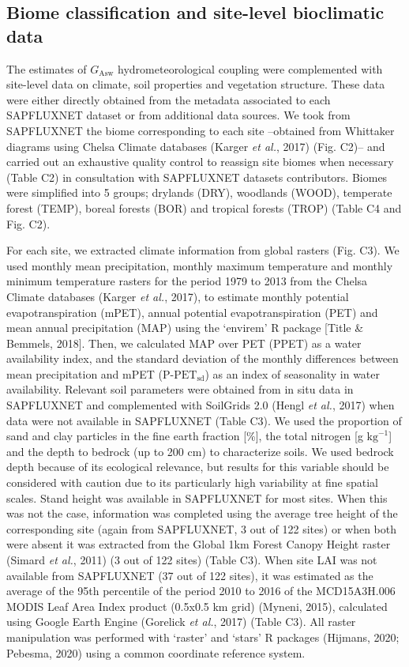 \documentclass[11pt,twoside]{reedthesis}
\begin{document}
\subsection{Biome classification and site-level bioclimatic
data}\label{biome-classification-and-site-level-bioclimatic-data}

The estimates of \(G_{\text{Asw}}\) hydrometeorological coupling were
complemented with site-level data on climate, soil properties and
vegetation structure. These data were either directly obtained from the
metadata associated to each SAPFLUXNET dataset or from additional data
sources. We took from SAPFLUXNET the biome corresponding to each site
--obtained from Whittaker diagrams using Chelsa Climate databases
(Karger \emph{et al.}, 2017) (Fig. C2)-- and carried out an exhaustive
quality control to reassign site biomes when necessary (Table C2) in
consultation with SAPFLUXNET datasets contributors. Biomes were
simplified into 5 groups; drylands (DRY), woodlands (WOOD), temperate
forest (TEMP), boreal forests (BOR) and tropical forests (TROP) (Table
C4 and Fig. C2).\par

For each site, we extracted climate information from global rasters
(Fig. C3). We used monthly mean precipitation, monthly maximum
temperature and monthly minimum temperature rasters for the period 1979
to 2013 from the Chelsa Climate databases (Karger \emph{et al.}, 2017),
to estimate monthly potential evapotranspiration (mPET), annual
potential evapotranspiration (PET) and mean annual precipitation (MAP)
using the `envirem' R package {[}Title \& Bemmels, 2018{]}. Then, we
calculated MAP over PET (PPET) as a water availability index, and the
standard deviation of the monthly differences between mean precipitation
and mPET (\(\text{P-PET}_{\text{sd}}\)) as an index of seasonality in
water availability. Relevant soil parameters were obtained from in situ
data in SAPFLUXNET and complemented with SoilGrids 2.0 (Hengl \emph{et
al.}, 2017) when data were not available in SAPFLUXNET (Table C3). We
used the proportion of sand and clay particles in the fine earth
fraction {[}\%{]}, the total nitrogen {[}g \(\text{kg}^{-1}\){]} and the
depth to bedrock (up to 200 cm) to characterize soils. We used bedrock
depth because of its ecological relevance, but results for this variable
should be considered with caution due to its particularly high
variability at fine spatial scales. Stand height was available in
SAPFLUXNET for most sites. When this was not the case, information was
completed using the average tree height of the corresponding site (again
from SAPFLUXNET, 3 out of 122 sites) or when both were absent it was
extracted from the Global 1km Forest Canopy Height raster (Simard
\emph{et al.}, 2011) (3 out of 122 sites) (Table C3). When site LAI was
not available from SAPFLUXNET (37 out of 122 sites), it was estimated as
the average of the 95th percentile of the period 2010 to 2016 of the
MCD15A3H.006 MODIS Leaf Area Index product (0.5x0.5 km grid) (Myneni,
2015), calculated using Google Earth Engine (Gorelick \emph{et al.},
2017) (Table C3). All raster manipulation was performed with `raster'
and `stars' R packages (Hijmans, 2020; Pebesma, 2020) using a common
coordinate reference system.\par
\end{document}
